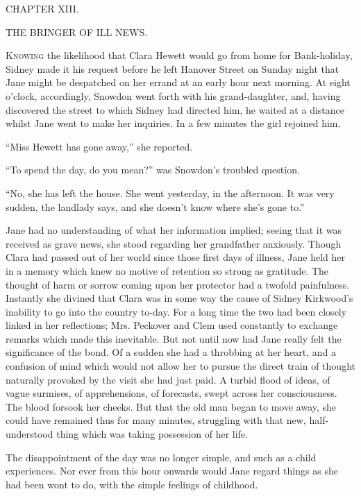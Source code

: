 {}

{CHAPTER XIII.}

THE BRINGER OF ILL NEWS.

\textsc{Knowing} the likelihood that Clara Hewett would go from home for
Bank-holiday, Sidney made it his request before he left Hanover Street
on Sunday night that Jane might be despatched on her errand at an early
hour next morning. At eight o'clock, accordingly, Snowdon went forth
with his grand-daughter, and, having discovered the street to which
Sidney had directed him, he waited at a distance whilst Jane went to
make her inquiries. In a few minutes the girl rejoined him.

``Miss Hewett has gone away,'' she reported.

``To spend the day, do you mean?'' was Snowdon's troubled question.

``No, she has left the house. She went yesterday, in the afternoon. It
was very {}sudden, the landlady says, and she doesn't know where she's
gone to.''

Jane had no understanding of what her information implied; seeing that
it was received as grave news, she stood regarding her grandfather
anxiously. Though Clara had passed out of her world since those first
days of illness, Jane held her in a memory which knew no motive of
retention so strong as gratitude. The thought of harm or sorrow coming
upon her protector had a twofold painfulness. Instantly she divined that
Clara was in some way the cause of Sidney Kirkwood's inability to go
into the country to-day. For a long time the two had been closely linked
in her reflections; Mrs. Peckover and Clem used constantly to exchange
remarks which made this inevitable. But not until now had Jane really
felt the significance of the bond. Of a sudden she had a throbbing at
her heart, and a confusion of mind which would not allow her to pursue
the direct train of thought naturally provoked by the visit she had just
paid. A turbid flood of ideas, of {}vague surmises, of apprehensions, of
forecasts, swept across her consciousness. The blood forsook her cheeks.
But that the old man began to move away, she could have remained thus
for many minutes, struggling with that new, half-understood thing which
was taking possession of her life.

The disappointment of the day was no longer simple, and such as a child
experiences. Nor ever from this hour onwards would Jane regard things as
she had been wont to do, with the simple feelings of childhood.

